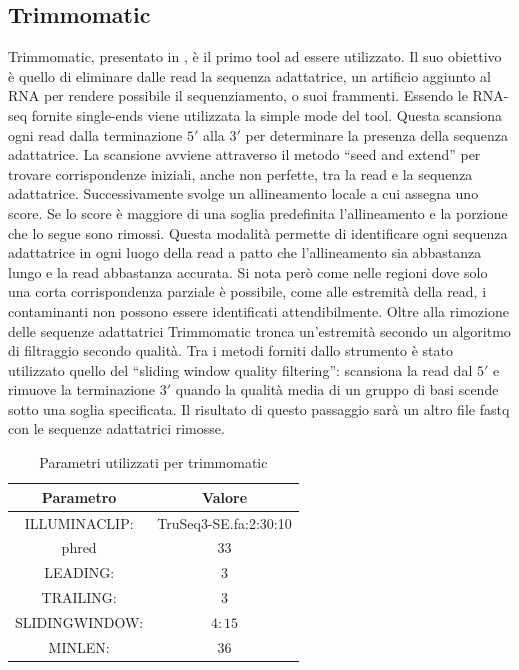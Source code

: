   	\subsection{Trimmomatic}
	Trimmomatic, presentato in \cite{trimmomatic}, \`e il primo tool ad essere utilizzato.
	Il suo obiettivo \`e quello di eliminare dalle read la sequenza adattatrice, un artificio aggiunto al RNA per rendere possibile il sequenziamento, o suoi frammenti.
	Essendo le RNA-seq fornite single-ends viene utilizzata la simple mode del tool.
	Questa scansiona ogni read dalla terminazione $5'$ alla $3'$ per determinare la presenza della sequenza adattatrice.
        La scansione avviene attraverso il metodo ``seed and extend'' per trovare corrispondenze iniziali, anche non perfette, tra la read e la sequenza adattatrice.
	Successivamente svolge un allineamento locale a cui assegna uno score.
        Se lo score \`e maggiore di una soglia predefinita l'allineamento e la porzione che lo segue sono rimossi.
	Questa modalit\`a permette di identificare ogni sequenza adattatrice in ogni luogo della read a patto che l'allineamento sia abbastanza lungo e la read abbastanza accurata.
	Si nota per\`o come nelle regioni dove solo una corta corrispondenza parziale \`e possibile, come alle estremit\`a della read, i contaminanti non possono essere identificati attendibilmente.
	Oltre alla rimozione delle sequenze adattatrici Trimmomatic tronca un'estremit\`a secondo un algoritmo di filtraggio secondo qualit\`a.
	Tra i metodi forniti dallo strumento \`e stato utilizzato quello del ``sliding window quality filtering'':
	scansiona la read dal $5'$ e rimuove la terminazione $3'$ quando la qualit\`a media di un gruppo di basi scende sotto una soglia specificata.
	Il risultato di questo passaggio sar\`a un altro file fastq con le sequenze adattatrici rimosse.
        \begin{table}[H]
                \begin{tabular}{|c|c|}
                        \hline
                        Parametro & Valore\\
                        \hline
                        ILLUMINACLIP: & TruSeq3-SE.fa:2:30:10\\
                        \hline
                        phred & $33$\\
                        \hline
                        LEADING: & $3$\\
                        \hline
                        TRAILING: & $3$\\
                        \hline
                        SLIDINGWINDOW: & $4:15$\\
                        \hline
                        MINLEN: & $36$\\
                        \hline
                 \end{tabular}
                 \centering
                 \caption{Parametri utilizzati per trimmomatic}
        \end{table}

